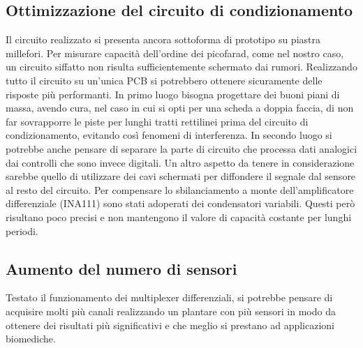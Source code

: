 \documentclass[12pt,a4paper,oneside,openright,italian]{article}
\begin{document}
\subsection{Ottimizzazione del circuito di condizionamento}
Il circuito realizzato si presenta ancora sottoforma di prototipo su piastra millefori. Per misurare capacit\`a dell'ordine dei picofarad, come nel nostro caso, un circuito siffatto non risulta sufficientemente schermato dai rumori. Realizzando tutto il circuito su un'unica PCB si potrebbero ottenere sicuramente delle risposte pi\`u performanti. In primo luogo bisogna progettare dei buoni piani di massa, avendo cura, nel caso in cui si opti per una scheda a doppia faccia, di non far sovrapporre le piste per lunghi tratti rettilinei prima del circuito di condizionamento, evitando cos\`i fenomeni di interferenza. In secondo luogo si potrebbe anche pensare di separare la parte di circuito che processa dati analogici dai controlli che sono invece digitali. Un altro aspetto da tenere in considerazione sarebbe quello di utilizzare dei cavi schermati per diffondere il segnale dal sensore al resto del circuito. Per compensare lo sbilanciamento a monte dell'amplificatore differenziale (INA111) sono stati adoperati dei condensatori variabili. Questi per\`o risultano poco precisi e non mantengono il valore di capacit\`a costante per lunghi periodi.

\subsection{Aumento del numero di sensori}
Testato il funzionamento dei multiplexer differenziali, si potrebbe pensare di acquisire molti pi\`u canali realizzando un plantare con pi\`u sensori in modo da ottenere dei risultati pi\`u significativi e che meglio si prestano ad applicazioni biomediche.
\end{document}
